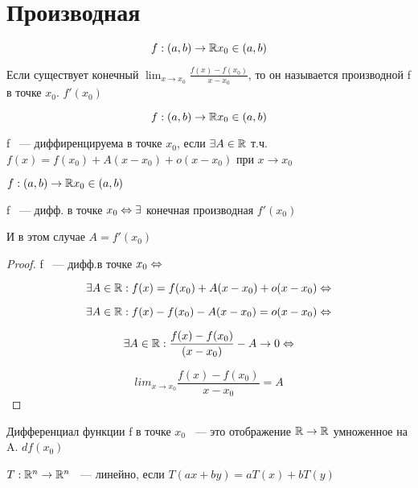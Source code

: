 ﻿\section{Производная}

\begin{Def}
 $$f:(a, b)\to \mathbb{R} x_0 \in (a, b)$$

 Если существует конечный $\lim_{x \to x_0} \frac{f(x) - f(x_0)}{x - x_0}$, то он называется производной f в точке $x_0$. $f'(x_0)$
\end{Def}

\begin{Def}
$$f:(a, b) \to \mathbb{R} x_0 \in (a, b)$$

f ~--- диффиренцируема в точке $x_0$, если $\exists A \in \mathbb{R}$ т.ч. $f(x) = f(x_0) + A(x - x_0) + o(x - x_0)$ при $x \to x_0$
\end{Def}

\begin{theorem}{}
$f:(a, b) \to \mathbb{R} x_0 \in (a, b)$

f ~--- дифф. в точке $x_0 \Leftrightarrow \exists$ конечная производная $f'(x_0)$

И в этом случае $A = f'(x_0)$ 
\end{theorem}

\begin{proof}
 f ~--- дифф.в точке $x_0 \Leftrightarrow$

 $$\exists A \in \mathbb{R}: f(x) = f(x_0) + A(x - x_0) + o(x - x_0) \Leftrightarrow $$

 $$\exists A \in \mathbb{R}: f(x) - f(x_0) - A(x - x_0) = o(x - x_0) \Leftrightarrow $$

 $$\exists A \in \mathbb{R}: \frac{f(x) - f(x_0)}{(x - x_0)} - A \to 0 \Leftrightarrow $$

 $$lim_{x \to x_0} \frac{f(x) - f(x_0)}{x - x_0} = A$$
\end{proof}

\begin{Def}
 Дифференциал функции f в точке $x_0$ ~--- это отображение $\mathbb{R} \to \mathbb{R}$ умноженное на A. $df(x_0)$
\end{Def}

$T:\mathbb{R}^n \to \mathbb{R}^n$ ~--- линейно, если $T(ax + by) = aT(x) + bT(y)$